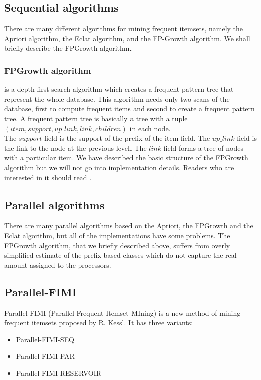\documentclass[journal]{IEEEtran/IEEEtran}
\begin{document}
\subsection{Sequential algorithms}
There are many different algorithms for mining frequent itemsets, namely the Apriori algorithm, the Eclat algorithm, and the FP-Growth algorithm. We shall briefly describe the FPGrowth algorithm.
\subsubsection*{FPGrowth algorithm} is a depth first search algorithm which creates a frequent pattern tree that represent the whole database. This algorithm needs only two scans of the database, first to compute frequent items and second to create a frequent pattern tree. A frequent pattern tree is basically a tree with a tuple $(item, support, up\_link, link, children)$ in each node. \\

The $support$ field is the support of the prefix of the item field. The $up\_link$ field is the link to the node at the previous level. The $link$ field forms a tree of nodes with a particular item. We have described the basic structure of the FPGrowth algorithm but we will not go into implementation details. Readers who are interested in it should read \cite{kessl}.
\subsection{Parallel algorithms}
There are many parallel algorithms based on the Apriori, the FPGrowth and the Eclat algorithm, but all of the implementations have some problems. The FPGrowth algorithm, that we briefly described above, suffers from overly simplified estimate of the prefix-based classes which do not capture the real amount assigned to the processors.
\subsection{Parallel-FIMI}
Parallel-FIMI (Parallel Frequent Itemset MIning) is a new method of mining frequent itemsets proposed by R. Kessl\cite{kessl}. It has three variants:
\begin{itemize}
\item Parallel-FIMI-SEQ
\item Parallel-FIMI-PAR
\item Parallel-FIMI-RESERVOIR
\end{itemize}
\end{document}
